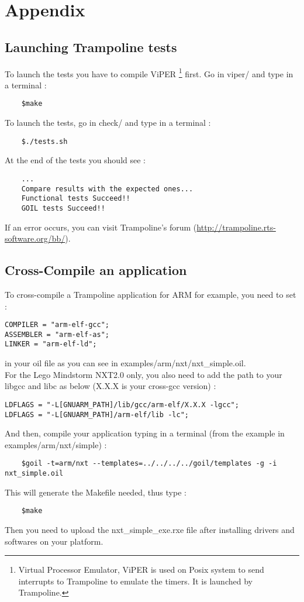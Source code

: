 
\chapter{Appendix}
\section{Launching Trampoline tests} \label{tests}
To launch the tests you have to compile ViPER \footnote{Virtual Processor Emulator, ViPER is used on Posix system to send interrupts to Trampoline to emulate the timers. It is launched by Trampoline.} first. Go in viper/ and type in a terminal :
	\begin{verbatim}
	$make
	\end{verbatim}
To launch the tests, go in check/ and type in a terminal :
	\begin{verbatim}
	$./tests.sh
	\end{verbatim}
At the end of the tests you should see :
	\begin{verbatim}
	...
	Compare results with the expected ones...
	Functional tests Succeed!!
	GOIL tests Succeed!!
	\end{verbatim}
If an error occurs, you can visit Trampoline's forum (\href{http://trampoline.rts-software.org/bb/}{http://trampoline.rts-software.org/bb/}).


\section{Cross-Compile an application} \label{compileanapplication}
To cross-compile a Trampoline application for ARM for example, you need to set  :
\begin{verbatim}
COMPILER = "arm-elf-gcc";
ASSEMBLER = "arm-elf-as";
LINKER = "arm-elf-ld";
\end{verbatim}
in your oil file as you can see in examples/arm/nxt/nxt\_simple.oil.\\
For the Lego Mindstorm NXT2.0 only, you also need to add the path to your libgcc and libc as below (X.X.X is your cross-gcc version) :
\begin{verbatim}
LDFLAGS = "-L[GNUARM_PATH]/lib/gcc/arm-elf/X.X.X -lgcc";
LDFLAGS = "-L[GNUARM_PATH]/arm-elf/lib -lc";
\end{verbatim}

And then, compile your application typing in a terminal (from the example in examples/arm/nxt/simple) :
	\begin{verbatim}
	$goil -t=arm/nxt --templates=../../../../goil/templates -g -i nxt_simple.oil
	\end{verbatim}
This will generate the Makefile needed, thus type :
	\begin{verbatim}
	$make
	\end{verbatim}
Then you need to upload the nxt\_simple\_exe.rxe file after installing drivers and softwares on your platform.

